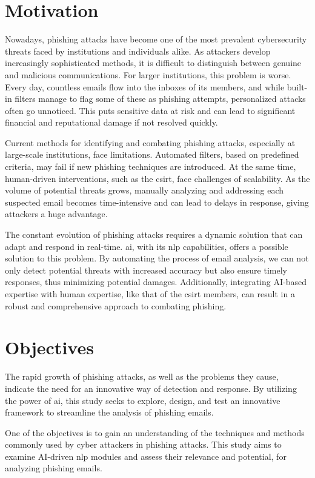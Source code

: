 \section{Motivation}

Nowadays, phishing attacks have become one of the most prevalent cybersecurity threats faced by institutions and individuals alike. As attackers develop increasingly sophisticated methods, it is difficult to distinguish between genuine and malicious communications. For larger institutions, this problem is worse. Every day, countless emails flow into the inboxes of its members, and while built-in filters manage to flag some of these as phishing attempts, personalized attacks often go unnoticed. This puts sensitive data at risk and can lead to significant financial and reputational damage if not resolved quickly.

Current methods for identifying and combating phishing attacks, especially at large-scale institutions, face limitations. Automated filters, based on predefined criteria, may fail if new phishing techniques are introduced. At the same time, human-driven interventions, such as the \ac{csirt}, face challenges of scalability. As the volume of potential threats grows, manually analyzing and addressing each suspected email becomes time-intensive and can lead to delays in response, giving attackers a huge advantage.

The constant evolution of phishing attacks requires a dynamic solution that can adapt and respond in real-time. \ac{ai}, with its \ac{nlp} capabilities, offers a possible solution to this problem. By automating the process of email analysis, we can not only detect potential threats with increased accuracy but also ensure timely responses, thus minimizing potential damages. Additionally, integrating AI-based expertise with human expertise, like that of the \ac{csirt} members, can result in a robust and comprehensive approach to combating phishing.

\section{Objectives}

The rapid growth of phishing attacks, as well as the problems they cause, indicate the need for an innovative way of detection and response. By utilizing the power of \ac{ai}, this study seeks to explore, design, and test an innovative framework to streamline the analysis of phishing emails.

One of the objectives is to gain an understanding of the techniques and methods commonly used by cyber attackers in phishing attacks.
This study aims to examine AI-driven \ac{nlp} modules and assess their relevance and potential, for analyzing phishing emails.

